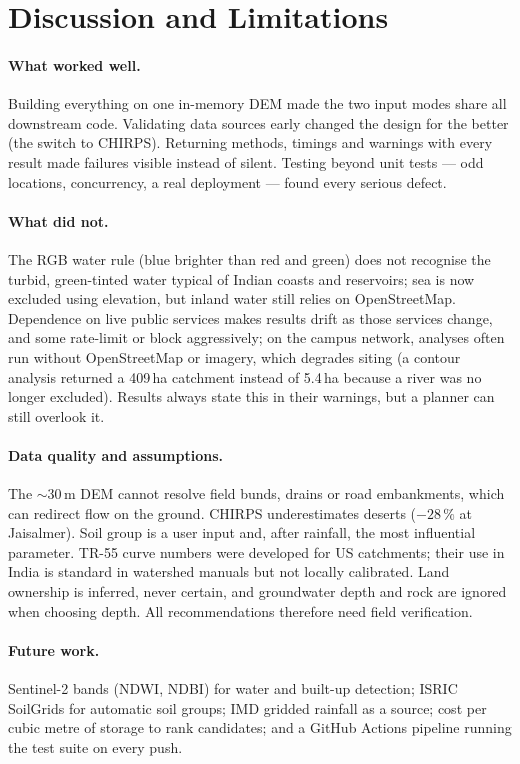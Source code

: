 \documentclass[manuscript,screen,review]{acmart}
\begin{document}
\section{Discussion and Limitations}
\label{sec:discussion}
\paragraph{What worked well.} Building everything on one in-memory DEM made the two input
modes share all downstream code. Validating data sources early changed the design for the
better (the switch to CHIRPS). Returning methods, timings and warnings with every result made
failures visible instead of silent. Testing beyond unit tests --- odd locations, concurrency,
a real deployment --- found every serious defect.

\paragraph{What did not.} The RGB water rule (blue brighter than red and green) does not
recognise the turbid, green-tinted water typical of Indian coasts and reservoirs; sea is now
excluded using elevation, but inland water still relies on OpenStreetMap. Dependence on live
public services makes results drift as those services change, and some rate-limit or block
aggressively; on the campus network, analyses often run without OpenStreetMap or imagery, which
degrades siting (a contour analysis returned a 409\,ha catchment instead of 5.4\,ha because a
river was no longer excluded). Results always state this in their warnings, but a planner can
still overlook it.

\paragraph{Data quality and assumptions.} The $\sim$30\,m DEM cannot resolve field bunds,
drains or road embankments, which can redirect flow on the ground. CHIRPS underestimates
deserts ($-28\,\%$ at Jaisalmer). Soil group is a user input and, after rainfall, the most
influential parameter. TR-55 curve numbers were developed for US catchments; their use in India
is standard in watershed manuals but not locally calibrated. Land ownership is inferred, never
certain, and groundwater depth and rock are ignored when choosing depth. All recommendations
therefore need field verification.

\paragraph{Future work.} Sentinel-2 bands (NDWI, NDBI) for water and built-up detection;
ISRIC SoilGrids for automatic soil groups; IMD gridded rainfall as a source; cost per cubic
metre of storage to rank candidates; and a GitHub Actions pipeline running the test suite on
every push.
\end{document}
